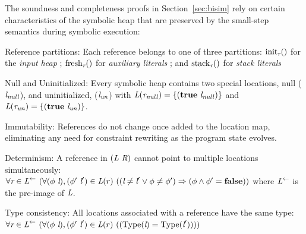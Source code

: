 The soundness and completeness proofs in Section~\ref{sec:bisim} rely
on certain characteristics of the symbolic heap that are preserved by
the small-step semantics during symbolic execution:

\begin{compactdesc}
\item[Reference partitions:] Each reference belongs to one of three partitions: $\mathrm{init}_{\emph{r}}()$ for the \emph{input
  heap}%
  ; $\mathrm{fresh}_{\emph{r}}()$ for \emph{auxiliary
  literals}%
  ; and $\mathrm{stack}_{\emph{r}}()$ for \emph{stack
  literals} %
\item[Null and Uninitialized:] Every symbolic heap contains 
two special locations, null ($\emph{l}_\mathit{null}$), and uninitialized,
  ($\emph{l}_\mathit{un}$) with $\emph{L}(\emph{r}_\mathit{null}) =
  \{(\textbf{true}\ \emph{l}_\mathit{null})\}$ and
  $\emph{L}(\emph{r}_\mathit{un}) =
  \{(\textbf{true}\ \emph{l}_\mathit{un})\}$. 
\item[Immutability:] References do not change once added to the
location map, eliminating any need for constraint rewriting as the program state evolves.
\item[Determinism:] A reference in $(\emph{L}\ \emph{R})$ cannot point to multiple locations simultaneously: 
$
\forall \cfgnt{r} \in \cfgnt{L}^\leftarrow\ (\forall (\phi\ \cfgnt{l}),(\phi^\prime\ \cfgnt{l}^\prime) \in \cfgnt{L}(r)\ (
(\cfgnt{l} \neq \cfgnt{l}^\prime \vee \phi \neq \phi^\prime) \Rightarrow (\phi \wedge \phi^\prime = \cfgt{false}))
$
where $\emph{L}^\leftarrow$ is the pre-image of $\emph{L}$. 
\item[Type consistency:] All locations associated with a reference have the same type:
$\forall \cfgnt{r} \in \cfgnt{L}^\leftarrow\ (\forall (\phi\ \cfgnt{l}),(\phi^\prime\ \cfgnt{l}^\prime) \in \cfgnt{L}(r)\ (
(\mathrm{Type}\lp\cfgnt{l}\rp = \mathrm{Type}\lp\cfgnt{l}^\prime\rp)))$

\end{compactdesc}

